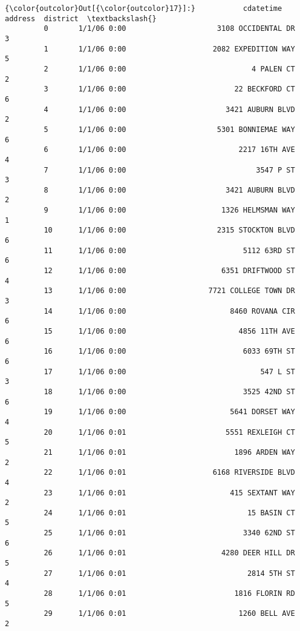 \documentclass[11pt]{article}
\begin{document}
\begin{Verbatim}[commandchars=\\\{\}]
{\color{outcolor}Out[{\color{outcolor}17}]:}           cdatetime                                address  district  \textbackslash{}
         0       1/1/06 0:00                     3108 OCCIDENTAL DR         3   
         1       1/1/06 0:00                    2082 EXPEDITION WAY         5   
         2       1/1/06 0:00                             4 PALEN CT         2   
         3       1/1/06 0:00                         22 BECKFORD CT         6   
         4       1/1/06 0:00                       3421 AUBURN BLVD         2   
         5       1/1/06 0:00                     5301 BONNIEMAE WAY         6   
         6       1/1/06 0:00                          2217 16TH AVE         4   
         7       1/1/06 0:00                              3547 P ST         3   
         8       1/1/06 0:00                       3421 AUBURN BLVD         2   
         9       1/1/06 0:00                      1326 HELMSMAN WAY         1   
         10      1/1/06 0:00                     2315 STOCKTON BLVD         6   
         11      1/1/06 0:00                           5112 63RD ST         6   
         12      1/1/06 0:00                      6351 DRIFTWOOD ST         4   
         13      1/1/06 0:00                   7721 COLLEGE TOWN DR         3   
         14      1/1/06 0:00                        8460 ROVANA CIR         6   
         15      1/1/06 0:00                          4856 11TH AVE         6   
         16      1/1/06 0:00                           6033 69TH ST         6   
         17      1/1/06 0:00                               547 L ST         3   
         18      1/1/06 0:00                           3525 42ND ST         6   
         19      1/1/06 0:00                        5641 DORSET WAY         4   
         20      1/1/06 0:01                       5551 REXLEIGH CT         5   
         21      1/1/06 0:01                         1896 ARDEN WAY         2   
         22      1/1/06 0:01                    6168 RIVERSIDE BLVD         4   
         23      1/1/06 0:01                        415 SEXTANT WAY         2   
         24      1/1/06 0:01                            15 BASIN CT         5   
         25      1/1/06 0:01                           3340 62ND ST         6   
         26      1/1/06 0:01                      4280 DEER HILL DR         5   
         27      1/1/06 0:01                            2814 5TH ST         4   
         28      1/1/06 0:01                         1816 FLORIN RD         5   
         29      1/1/06 0:01                          1260 BELL AVE         2   

\end{Verbatim}
\end{document}
